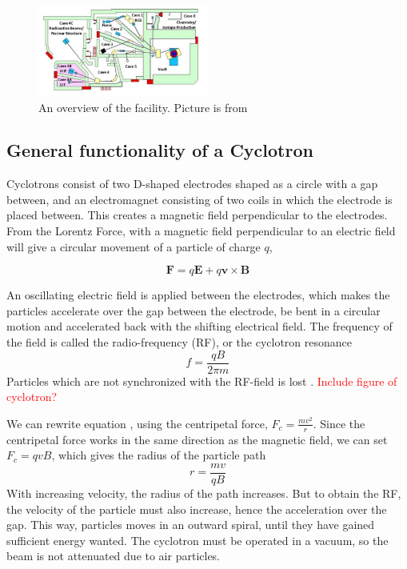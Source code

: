 \documentclass[a4paper,11pt,twoside]{book}
\begin{document}
\begin{figure}
    \centering
    \includegraphics[width=0.5\textwidth]{Experiment/LBL_88.png}
    \caption{An overview of the facility.  Picture is from \cite{KireeffCovo2018}}
    \label{fig:LBNL_88}
\end{figure}

\subsection{General functionality of a Cyclotron}
Cyclotrons consist of two D-shaped electrodes shaped as a circle with a gap between, and an electromagnet consisting of two coils in which the electrode is placed between. This creates a magnetic field perpendicular to the electrodes. 
From the Lorentz Force, with a magnetic field perpendicular to an electric field will give a circular movement of a particle of charge $q$,

\begin{equation} \label{eq:Lorentz}
    \textbf{F} = q\textbf{E} + q\textbf{v} \times \textbf{B}
\end{equation}

An oscillating electric field is applied between the electrodes, which makes the particles accelerate over the gap between the electrode, be bent in a circular motion and accelerated back with the shifting electrical field. The frequency of the field is called the radio-frequency (RF), or the cyclotron resonance
\begin{equation}
    f = \frac{qB}{2\pi m}
\end{equation}
Particles which are not synchronized with the RF-field is lost \cite{KireeffCovo2018}. \textcolor{red}{Include figure of cyclotron?}  

We can rewrite equation \label{eq:Lorentz}, using the centripetal force, $F_c = \frac{mv^2}{r}$. Since the centripetal force works in the same direction as the magnetic field, we can set $F_c=qvB$, which gives the radius of the particle path 
\begin{equation}
    r = \frac{mv}{qB}
\end{equation}
With increasing velocity, the radius of the path increases. But to obtain the RF, the velocity of the particle must also increase, hence the acceleration over the gap. This way, particles moves in an outward spiral, until they have gained sufficient energy wanted. The cyclotron must be operated in a vacuum, so the beam is not attenuated due to air particles. 
\end{document}
